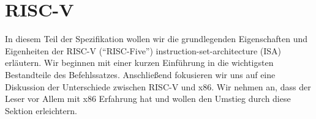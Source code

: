 \chapter{RISC-V}

In diesem Teil der Spezifikation wollen wir die grundlegenden Eigenschaften und
Eigenheiten der RISC-V (``RISC-Five'') instruction-set-architecture (ISA)
erläutern. Wir beginnen mit einer kurzen Einführung in die wichtigsten
Bestandteile des Befehlssatzes. Anschließend fokusieren wir uns auf eine
Diskussion der Unterschiede zwischen RISC-V und x86. Wir nehmen an, dass der
Leser vor Allem mit x86 Erfahrung hat und wollen den Umstieg durch diese Sektion
erleichtern.


